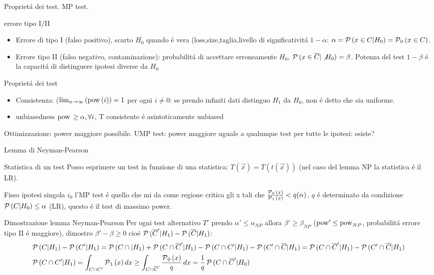 \begin{frame}{Propriet\'a dei test. MP test.}
\begin{block}{errore tipo I/II}
	\begin{itemize}
		\item Errore di tipo I (falso positivo), scarto $H_0$ quando \'e vera (loss,size,taglia,livello di significativit\'a $1-\alpha$: $\alpha=\operatorname{\mathcal{P}}{(x\in C|H_0)}=\operatorname{\mathcal{P}}_0{(x\in C)}$.
		\item Errore tipo II (falso negativo, contaminazione): probabilit\'a di accettare erroneamente $H_0$, $\operatorname{\mathcal{P}}{(x\in\overline{C}|\not{H_0})}=\beta$. Potenza del test $1-\beta$ \'e la capacit\'a di distinguere ipotesi diverse da $H_0$ 
	\end{itemize}
\end{block}
\begin{block}{Propriet\'a dei test}
	\begin{itemize}
		\item Consistenza: ($\lim_{n\to\infty}{(\operatorname{pow}{(i)})}=1$ per ogni $i\neq0$: se prendo infiniti dati distinguo $H_1$ da $H_0$, non \'e detto che sia uniforme.
		\item unbiasedness $\operatorname{pow}{}\geq\alpha, \forall i$, T consistente \'e asintoticamente unbiased
	\end{itemize}
\end{block}
 \begin{block}{Ottimizzazione: power maggiore possibile.}
UMP test: power maggiore uguale a qualunque test per tutte le ipotesi: esiste?
\end{block}
\end{frame}

\begin{frame}{Lemma di Neyman-Pearson}
\begin{block}{Statistica di un test}
Posso esprimere un test in funzione di una statistica: $T(\vec{x})=T(t(\vec{x}))$ (nel caso del lemma NP la statistica \'e il LR). 
\end{block}
Fisso ipotesi singola $i_0$ l'MP test \'e quello che mi da come regione critica gli x tali che $\frac{\operatorname{\mathcal{P}}_0{(x)}}{\operatorname{\mathcal{P}}_1{(x)}}<q(\alpha)$, $q$ \'e determinato da condizione $\operatorname{\mathcal{P}}{(C|H_0)}\leq\alpha$ (LR), questo \'e il test di massimo power.

\end{frame}

\begin{wordonframe}{Dimostrazione lemma Neyman-Pearson}
Per ogni test alternativo $T'$ prendo $\alpha'\leq\alpha_{NP}$ allora $\beta'\geq\beta_{NP}$ ($\operatorname{pow}'\leq\operatorname{pow}_{NP}$, probabilit\'a errore tipo II \'e maggiore), dimostro $\beta'-\beta\geq0$ cio\'e $\operatorname{\mathcal{P}}{(\overline{C}'|H_1)}-\operatorname{\mathcal{P}}{(\overline{C}|H_1)}$:
\begin{align*}
&\operatorname{\mathcal{P}}{(C|H_1)}-\operatorname{\mathcal{P}}{(C'|H_1)}=\operatorname{\mathcal{P}}{(C\cap|H_1)}+\operatorname{\mathcal{P}}{(C\cap\overline{C}'|H_1)}-\operatorname{\mathcal{P}}{(C\cap C'|H_1)}-\operatorname{\mathcal{P}}{(C'\cap\overline{C}|H_1)}=\operatorname{\mathcal{P}}{(C\cap\overline{C}'|H_1)}-\operatorname{\mathcal{P}}{(C'\cap\overline{C}|H_1)}\\
&\operatorname{\mathcal{P}}{(C\cap C'|H_1)}=\int_{C\cap C'}\operatorname{\mathcal{P}}_1{(x)}\,dx\geq\int_{C\cap \overline{C}'}\frac{\operatorname{\mathcal{P}}_0{(x)}}{q}\,dx=\frac{1}{q}\operatorname{\mathcal{P}}{(C\cap\overline{C}'|H_0)}
\end{align*}
\end{wordonframe}

